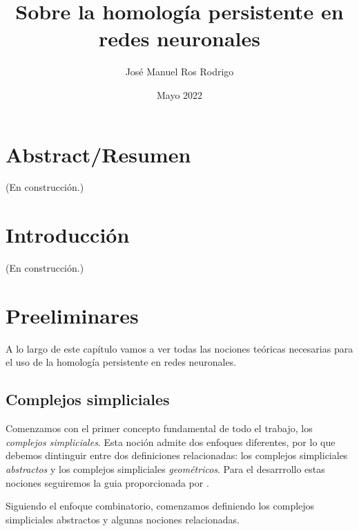 \documentclass[12pt, a4paper, twoside]{book}
\title{Sobre la homología persistente en redes neuronales}
\author{José Manuel Ros Rodrigo}
\affil{Facultad de Ciencia y Tecnología\\
  Universidad de La Rioja}
\date{Mayo 2022}
\numberwithin{equation}{section}
\theoremstyle{definition}
\theoremstyle{remark}
\theoremstyle{plain}
\begin{document}
	\pagestyle{main}
	\maketitle
	
	\chapter*{Abstract/Resumen}
	(En construcción.)

	
	\newpage

	\tableofcontents

	\newpage

	\chapter{Introducción}
	(En construcción.)

	\newpage

	\chapter{Preeliminares}

	A lo largo de este capítulo vamos a ver todas las nociones teóricas 
	necesarias para el uso de la homología persistente en redes neuronales.	
	
	\section{Complejos simpliciales}
	Comenzamos con el primer concepto fundamental de todo el trabajo, los 
	\emph{complejos simpliciales}. Esta noción admite dos enfoques 
	diferentes, por lo que debemos dintinguir entre dos definiciones 
	relacionadas: los complejos simpliciales \emph{abstractos} y los 
	complejos simpliciales \emph{geométricos}. Para el desarrrollo estas 
	nociones seguiremos la guia proporcionada por 
	\cite{TopoAlg-Edelsbrunner,Intro-Otter}.

	Siguiendo el enfoque combinatorio, comenzamos definiendo los complejos 
	simpliciales abstractos y algunas nociones relacionadas. 
\end{document}
